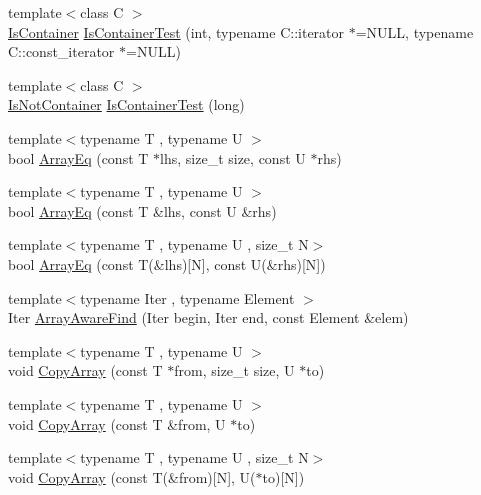\begin{DoxyCompactItemize}
\item 
{\footnotesize template$<$class C $>$ }\\\hyperlink{namespacetesting_1_1internal_ad8f0c2883245f1df2a53618a49f0deb3}{Is\+Container} \hyperlink{namespacetesting_1_1internal_acb6ea1086293c1d6636e3c67941351fb}{Is\+Container\+Test} (int, typename C\+::iterator $\ast$=N\+U\+LL, typename C\+::const\+\_\+iterator $\ast$=N\+U\+LL)
\item 
{\footnotesize template$<$class C $>$ }\\\hyperlink{namespacetesting_1_1internal_abf080521ce135deb510e0a7830fd3d33}{Is\+Not\+Container} \hyperlink{namespacetesting_1_1internal_af545a2ae928b8a9e7581978234464275}{Is\+Container\+Test} (long)
\item 
{\footnotesize template$<$typename T , typename U $>$ }\\bool \hyperlink{namespacetesting_1_1internal_af4bebf36baf0b0a5b26d051dde55fa47}{Array\+Eq} (const T $\ast$lhs, size\+\_\+t size, const U $\ast$rhs)
\item 
{\footnotesize template$<$typename T , typename U $>$ }\\bool \hyperlink{namespacetesting_1_1internal_a49b4d0ee49c0f8c93bab29ebd20630cc}{Array\+Eq} (const T \&lhs, const U \&rhs)
\item 
{\footnotesize template$<$typename T , typename U , size\+\_\+t N$>$ }\\bool \hyperlink{namespacetesting_1_1internal_a5cb6f81ee827130024261121c742b26c}{Array\+Eq} (const T(\&lhs)\mbox{[}N\mbox{]}, const U(\&rhs)\mbox{[}N\mbox{]})
\item 
{\footnotesize template$<$typename Iter , typename Element $>$ }\\Iter \hyperlink{namespacetesting_1_1internal_a94a857fe6ff32cf4fdc4769a4071f239}{Array\+Aware\+Find} (Iter begin, Iter end, const Element \&elem)
\item 
{\footnotesize template$<$typename T , typename U $>$ }\\void \hyperlink{namespacetesting_1_1internal_afb1b9728aaaf6d9fe6246a19cfe3f7f5}{Copy\+Array} (const T $\ast$from, size\+\_\+t size, U $\ast$to)
\item 
{\footnotesize template$<$typename T , typename U $>$ }\\void \hyperlink{namespacetesting_1_1internal_a84d0e746ba0827cc52b53d22000de0e8}{Copy\+Array} (const T \&from, U $\ast$to)
\item 
{\footnotesize template$<$typename T , typename U , size\+\_\+t N$>$ }\\void \hyperlink{namespacetesting_1_1internal_a1e7ae855686720615dcd5754c8181c62}{Copy\+Array} (const T(\&from)\mbox{[}N\mbox{]}, U($\ast$to)\mbox{[}N\mbox{]})

\end{DoxyCompactItemize}
